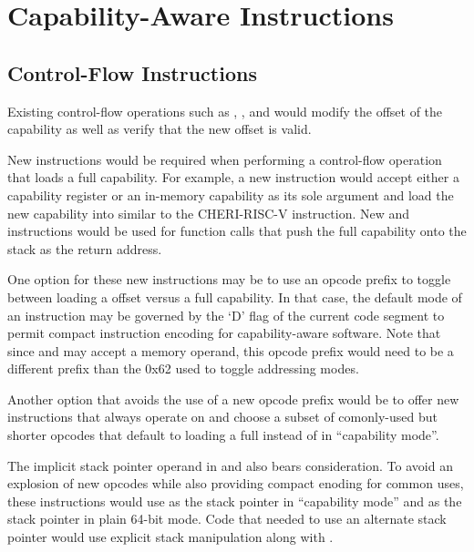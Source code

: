 \section{Capability-Aware Instructions}

\subsection{Control-Flow Instructions}

Existing control-flow operations such as ,
, and  would modify the offset of the
\CIP{} capability as well as verify that the new offset is valid.

New instructions would be required when performing a control-flow
operation that loads a full \CIP{} capability.  For example, a new
 instruction would accept either a capability register
or an in-memory capability as its sole argument and load the new capability
into \CIP{} similar to the CHERI-RISC-V  instruction.
New  and  instructions would be
used for function calls that push the full \CIP{} capability onto the stack
as the return address.

One option for these new instructions may be to use an opcode prefix
to toggle between loading a \RIP{} offset versus a full \CIP{}
capability.  In that case, the default mode of an instruction may be
governed by the `D' flag of the current code segment to permit compact
instruction encoding for capability-aware software.  Note that since
 and  may accept a memory
operand, this opcode prefix would need to be a different prefix than
the 0x62 used to toggle addressing modes.

Another option that avoids the use of a new opcode prefix would be to
offer new instructions that always operate on \CIP{} and choose a
subset of comonly-used but shorter opcodes that default to loading a
full \CIP{} instead of \RIP{} in ``capability mode''.

The implicit stack pointer operand in  and
 also bears consideration.  To avoid an
explosion of new opcodes while also providing compact enoding for
common uses, these instructions would use \CSP{} as the stack pointer
in ``capability mode'' and \RSP{} as the stack pointer in plain 64-bit
mode.  Code that needed to use an alternate stack pointer would use
explicit stack manipulation along with .

